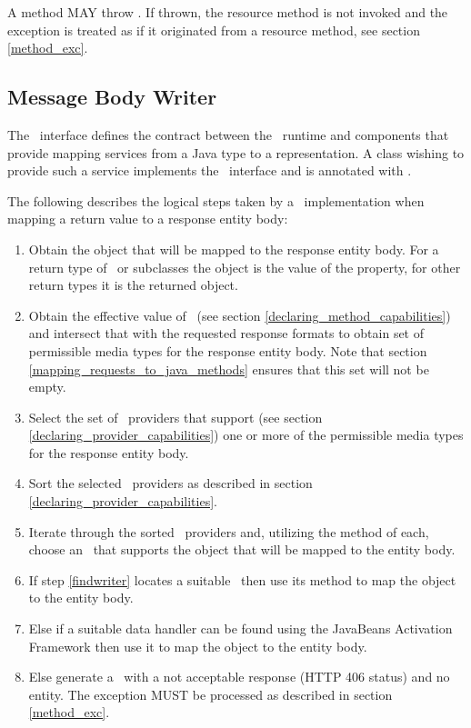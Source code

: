 A \MsgRead{} method MAY throw \WebAppExc. If thrown, the resource method is not invoked and the exception is treated as if it originated from a resource method, see section \ref{method_exc}.

\subsection{Message Body Writer}
\label{message_body_writer}

The \MsgWrite\ interface defines the contract between the \jaxrs\ runtime and components that provide mapping services from a Java type to a representation. A class wishing to provide such a service implements the \MsgWrite\ interface and is annotated with \Provider.

The following describes the logical steps taken by a \jaxrs\ implementation when mapping a return value to a response entity body:

\begin{enumerate}
\item Obtain the object that will be mapped to the response entity body. For a return type of \Response\ or subclasses the object is the value of the  property, for other return types it is the returned object.
\item Obtain the effective value of \Produces\ (see section \ref{declaring_method_capabilities}) and intersect that with the requested response formats to obtain set of permissible media types for the response entity body. Note that section \ref{mapping_requests_to_java_methods} ensures that this set will not be empty.
\item Select the set of \MsgWrite\ providers that support (see section \ref{declaring_provider_capabilities}) one or more of the permissible media types for the response entity body.
\item Sort the selected \MsgWrite\ providers as described in section \ref{declaring_provider_capabilities}.
\item\label{findwriter} Iterate through the sorted \MsgWrite\ providers and, utilizing the  method of each, choose an \MsgWrite\ that supports the object that will be mapped to the entity body.
\item If step \ref{findwriter} locates a suitable \MsgWrite\ then use its  method to map the object to the entity body.
\item Else if a suitable data handler can be found using the JavaBeans Activation Framework\cite{jaf} then use it to map the object to the entity body.
\item Else generate a \WebAppExc\ with a not acceptable response (HTTP 406 status) and no entity. The exception MUST be processed as described in section \ref{method_exc}.
\end{enumerate}

